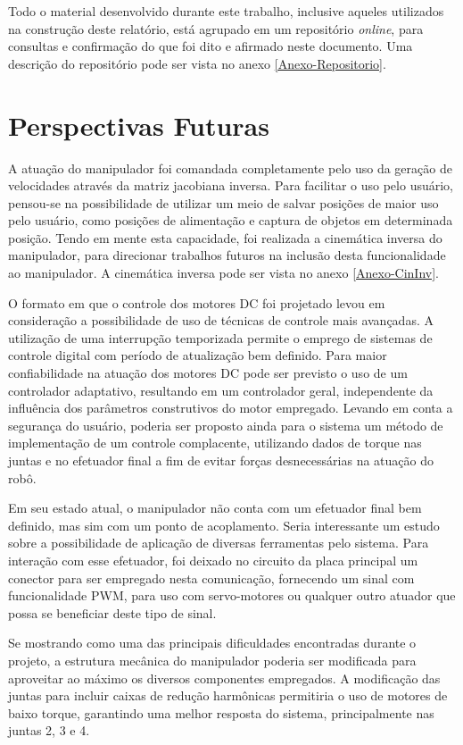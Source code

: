 Todo o material desenvolvido durante este trabalho, inclusive aqueles utilizados na construção deste 
relatório, está agrupado em um repositório \textit{online}, para consultas e confirmação do que foi 
dito e afirmado neste documento. Uma descrição do repositório pode ser vista no anexo \ref{Anexo-Repositorio}.

\section{Perspectivas Futuras}

A atuação do manipulador foi comandada completamente pelo uso da geração de velocidades através da matriz
jacobiana inversa. Para facilitar o uso pelo usuário, pensou-se na possibilidade de utilizar um meio de 
salvar posições de maior uso pelo usuário, como posições de alimentação e captura de objetos em determinada 
posição. Tendo em mente esta capacidade, foi realizada a cinemática inversa do manipulador, para direcionar
trabalhos futuros na inclusão desta funcionalidade ao manipulador. A cinemática inversa pode ser vista no anexo
\ref{Anexo-CinInv}.

O formato em que o controle dos motores DC foi projetado levou em consideração a possibilidade de uso de técnicas 
de controle mais avançadas. A utilização de uma interrupção temporizada permite o emprego de sistemas de controle
digital com período de atualização bem definido. Para maior confiabilidade na atuação dos motores DC pode ser 
previsto o uso de um controlador adaptativo, resultando em um controlador geral, independente da influência dos 
parâmetros construtivos do motor empregado. Levando em conta a segurança do usuário, poderia ser proposto ainda 
para o sistema um método de implementação de um controle complacente, utilizando dados de torque nas juntas e no
efetuador final a fim de evitar forças desnecessárias na atuação do robô.

Em seu estado atual, o manipulador não conta com um efetuador final bem definido, mas sim com um ponto 
de acoplamento. Seria interessante um estudo sobre a possibilidade de aplicação de diversas ferramentas 
pelo sistema. Para interação com esse efetuador, foi deixado no circuito da placa principal um conector
para ser empregado nesta comunicação, fornecendo um sinal com funcionalidade PWM, para uso com servo-motores 
ou qualquer outro atuador que possa se beneficiar deste tipo de sinal.

Se mostrando como uma das principais dificuldades encontradas durante o projeto, a estrutura mecânica do 
manipulador poderia ser modificada para aproveitar ao máximo os diversos componentes empregados. A 
modificação das juntas para incluir caixas de redução harmônicas permitiria o uso de motores de baixo 
torque, garantindo uma melhor resposta do sistema, principalmente nas juntas 2, 3 e 4.